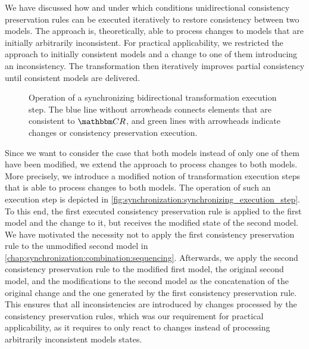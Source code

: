We have discussed how and under which conditions unidirectional consistency preservation rules can be executed iteratively to restore consistency between two models.
The approach is, theoretically, able to process changes to models that are initially arbitrarily inconsistent.
For practical applicability, we restricted the approach to initially consistent models and a change to one of them introducing an inconsistency.
The transformation then iteratively improves partial consistency until consistent models are delivered.

\begin{figure}
    \centering
    
    \caption[Synchronizing bidirectional transformation execution step]{Operation of a synchronizing bidirectional transformation execution step.
    The blue line without arrowheads connects elements that are consistent to $\consistencyrelationset{CR}$, and green lines with arrowheads indicate changes or consistency preservation execution.
    }
    \label{fig:synchronization:synchronizing_execution_step}
\end{figure}

Since we want to consider the case that both models instead of only one of them have been modified, we extend the approach to process changes to both models.
More precisely, we introduce a modified notion of transformation execution steps that is able to process changes to both models.
The operation of such an execution step is depicted in \autoref{fig:synchronization:synchronizing_execution_step}.
To this end, the first executed consistency preservation rule is applied to the first model and the change to it, but receives the modified state of the second model.
We have motivated the necessity not to apply the first consistency preservation rule to the unmodified second model in \autoref{chap:synchronization:combination:sequencing}.
Afterwards, we apply the second consistency preservation rule to the modified first model, the original second model, and the modifications to the second model as the concatenation of the original change and the one generated by the first consistency preservation rule.
This ensures that all inconsistencies are introduced by changes processed by the consistency preservation rules, which was our requirement for practical applicability, as it requires to only react to changes instead of processing arbitrarily inconsistent models states.

